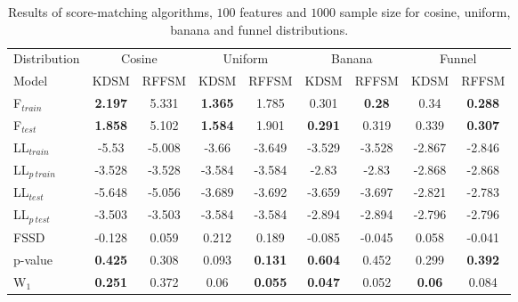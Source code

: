 \begin{table}[!h]
    \centering
\caption{Results of score-matching algorithms, $100$ features and $1000$ sample size for cosine, uniform, banana and funnel distributions.}
    \label{tab:tab:2d_1000_100_1}    
    \begin{tabular}{lcccccccc}
\toprule
Distribution &  \multicolumn{2}{c}{Cosine} & \multicolumn{2}{c}{Uniform} & \multicolumn{2}{c}{Banana}& \multicolumn{2}{c}{Funnel}\\
Model        &  KDSM &  RFFSM &  KDSM &  RFFSM &  KDSM &  RFFSM &  KDSM &  RFFSM \\
\midrule
F$_{train}$&           \textbf{2.197} &      5.331 &           \textbf{1.365} &      1.785 &           0.301 &       \textbf{0.28} &            0.34 &      \textbf{0.288} \\
F$_{test}$  &           \textbf{1.858} &      5.102 &           \textbf{1.584} &      1.901 &           \textbf{0.291} &      0.319 &           0.339 &      \textbf{0.307} \\
LL$_{train}$        &           -5.53 &     -5.008 &           -3.66 &     -3.649 &          -3.529 &     -3.528 &          -2.867 &     -2.846 \\
LL$_{p~train}$    &          -3.528 &     -3.528 &          -3.584 &     -3.584 &           -2.83 &      -2.83 &          -2.868 &     -2.868 \\
LL$_{test}$        &          -5.648 &     -5.056 &          -3.689 &     -3.692 &          -3.659 &     -3.697 &          -2.821 &     -2.783 \\
LL$_{p~test}$     &          -3.503 &     -3.503 &          -3.584 &     -3.584 &          -2.894 &     -2.894 &          -2.796 &     -2.796 \\
FSSD             &          -0.128 &      0.059 &           0.212 &      0.189 &          -0.085 &     -0.045 &           0.058 &     -0.041 \\
p-value          &           \textbf{0.425} &      0.308 &           0.093 &      \textbf{0.131} &           \textbf{0.604} &      0.452 &           0.299 &      \textbf{0.392} \\
W$_1$               &        \textbf{0.251} &   0.372 &       0.06 &  \textbf{0.055} &       \textbf{0.047} &  0.052 &       \textbf{0.06} &  0.084 \\
\bottomrule
\end{tabular}
\end{table}

